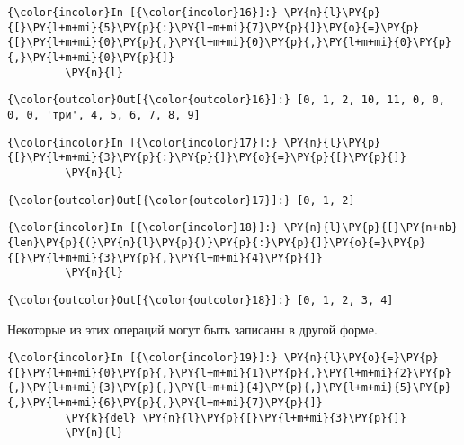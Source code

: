     \begin{Verbatim}[commandchars=\\\{\}]
{\color{incolor}In [{\color{incolor}16}]:} \PY{n}{l}\PY{p}{[}\PY{l+m+mi}{5}\PY{p}{:}\PY{l+m+mi}{7}\PY{p}{]}\PY{o}{=}\PY{p}{[}\PY{l+m+mi}{0}\PY{p}{,}\PY{l+m+mi}{0}\PY{p}{,}\PY{l+m+mi}{0}\PY{p}{,}\PY{l+m+mi}{0}\PY{p}{]}
         \PY{n}{l}
\end{Verbatim}

            \begin{Verbatim}[commandchars=\\\{\}]
{\color{outcolor}Out[{\color{outcolor}16}]:} [0, 1, 2, 10, 11, 0, 0, 0, 0, 'три', 4, 5, 6, 7, 8, 9]
\end{Verbatim}
        
    \begin{Verbatim}[commandchars=\\\{\}]
{\color{incolor}In [{\color{incolor}17}]:} \PY{n}{l}\PY{p}{[}\PY{l+m+mi}{3}\PY{p}{:}\PY{p}{]}\PY{o}{=}\PY{p}{[}\PY{p}{]}
         \PY{n}{l}
\end{Verbatim}

            \begin{Verbatim}[commandchars=\\\{\}]
{\color{outcolor}Out[{\color{outcolor}17}]:} [0, 1, 2]
\end{Verbatim}
        
    \begin{Verbatim}[commandchars=\\\{\}]
{\color{incolor}In [{\color{incolor}18}]:} \PY{n}{l}\PY{p}{[}\PY{n+nb}{len}\PY{p}{(}\PY{n}{l}\PY{p}{)}\PY{p}{:}\PY{p}{]}\PY{o}{=}\PY{p}{[}\PY{l+m+mi}{3}\PY{p}{,}\PY{l+m+mi}{4}\PY{p}{]}
         \PY{n}{l}
\end{Verbatim}

            \begin{Verbatim}[commandchars=\\\{\}]
{\color{outcolor}Out[{\color{outcolor}18}]:} [0, 1, 2, 3, 4]
\end{Verbatim}
        
    Некоторые из этих операций могут быть записаны в другой форме.

    \begin{Verbatim}[commandchars=\\\{\}]
{\color{incolor}In [{\color{incolor}19}]:} \PY{n}{l}\PY{o}{=}\PY{p}{[}\PY{l+m+mi}{0}\PY{p}{,}\PY{l+m+mi}{1}\PY{p}{,}\PY{l+m+mi}{2}\PY{p}{,}\PY{l+m+mi}{3}\PY{p}{,}\PY{l+m+mi}{4}\PY{p}{,}\PY{l+m+mi}{5}\PY{p}{,}\PY{l+m+mi}{6}\PY{p}{,}\PY{l+m+mi}{7}\PY{p}{]}
         \PY{k}{del} \PY{n}{l}\PY{p}{[}\PY{l+m+mi}{3}\PY{p}{]}
         \PY{n}{l}
\end{Verbatim}

